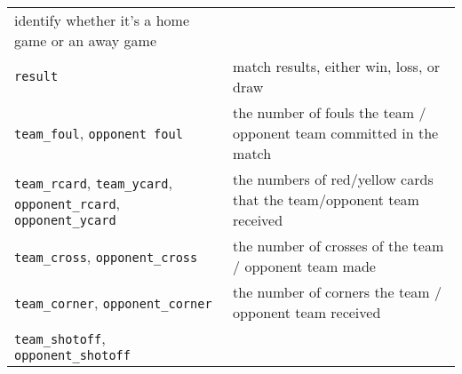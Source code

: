 \documentclass[]{book}
\theoremstyle{definition}
\theoremstyle{definition}
\theoremstyle{definition}
\theoremstyle{remark}
\begin{document}
\begin{longtable}[]{@{}ll@{}}
\begin{minipage}[t]{0.51\columnwidth}
identify whether it's a home game or an away game\strut
\end{minipage}\tabularnewline
\begin{minipage}[t]{0.43\columnwidth}\raggedright\strut
\texttt{result}\strut
\end{minipage} & \begin{minipage}[t]{0.51\columnwidth}\raggedright\strut
match results, either win, loss, or draw\strut
\end{minipage}\tabularnewline
\begin{minipage}[t]{0.43\columnwidth}\raggedright\strut
\texttt{team\_foul}, \texttt{opponent\ foul}\strut
\end{minipage} & \begin{minipage}[t]{0.51\columnwidth}\raggedright\strut
the number of fouls the team / opponent team committed in the
match\strut
\end{minipage}\tabularnewline
\begin{minipage}[t]{0.43\columnwidth}\raggedright\strut
\texttt{team\_rcard}, \texttt{team\_ycard}, \texttt{opponent\_rcard},
\texttt{opponent\_ycard}\strut
\end{minipage} & \begin{minipage}[t]{0.51\columnwidth}\raggedright\strut
the numbers of red/yellow cards that the team/opponent team
received\strut
\end{minipage}\tabularnewline
\begin{minipage}[t]{0.43\columnwidth}\raggedright\strut
\texttt{team\_cross}, \texttt{opponent\_cross}\strut
\end{minipage} & \begin{minipage}[t]{0.51\columnwidth}\raggedright\strut
the number of crosses of the team / opponent team made\strut
\end{minipage}\tabularnewline
\begin{minipage}[t]{0.43\columnwidth}\raggedright\strut
\texttt{team\_corner}, \texttt{opponent\_corner}\strut
\end{minipage} & \begin{minipage}[t]{0.51\columnwidth}\raggedright\strut
the number of corners the team / opponent team received\strut
\end{minipage}\tabularnewline
\begin{minipage}[t]{0.43\columnwidth}\raggedright\strut
\texttt{team\_shotoff}, \texttt{opponent\_shotoff}\strut
\end{minipage} & \begin{minipage}[t]{0.51\columnwidth}\raggedright\strut

\end{minipage}
\end{longtable}
\end{document}
